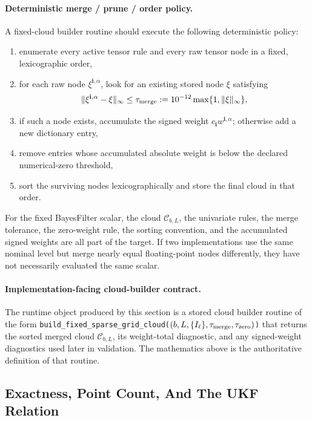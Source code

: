 \paragraph{Deterministic merge / prune / order policy.}
A fixed-cloud builder routine should execute the following deterministic policy:
\begin{enumerate}[leftmargin=0.28in]
  \item enumerate every active tensor rule and every raw tensor node in a fixed,
  lexicographic order,
  \item for each raw node \(\xi^{\mathbf i,\alpha}\), look for an existing stored
  node \(\xi\) satisfying
  \begin{equation}
    \|\xi^{\mathbf i,\alpha}-\xi\|_\infty
    \le
    \tau_{\rm merge}
    :=10^{-12}\max\{1,\|\xi\|_\infty\},
    \label{eq:bf-hd-sgqf-merge-rule}
  \end{equation}
  \item if such a node exists, accumulate the signed weight
  \(c_{\mathbf i}w^{\mathbf i,\alpha}\); otherwise add a new dictionary entry,
  \item remove entries whose accumulated absolute weight is below the declared
  numerical-zero threshold,
  \item sort the surviving nodes lexicographically and store the final cloud in
  that order.
\end{enumerate}
For the fixed BayesFilter scalar, the cloud \(\mathcal C_{b,L}\), the univariate
rules, the merge tolerance, the zero-weight rule, the sorting convention, and
the accumulated signed weights are all part of the target.  If two implementations
use the same nominal level but merge nearly equal floating-point nodes
differently, they have not necessarily evaluated the same scalar.

\paragraph{Implementation-facing cloud-builder contract.}
The runtime object produced by this section is a stored cloud builder routine of
the form
\texttt{build\_fixed\_sparse\_grid\_cloud(}$(b,L,\{I_\ell\},\tau_{\rm merge},\tau_{\rm zero})$\texttt{)}
that returns the sorted merged cloud \(\mathcal C_{b,L}\), its weight-total
diagnostic, and any signed-weight diagnostics used later in validation.  The
mathematics above is the authoritative definition of that routine.

\subsection{Exactness, Point Count, And The UKF Relation}
\label{subsec:p32-source-theorems}

